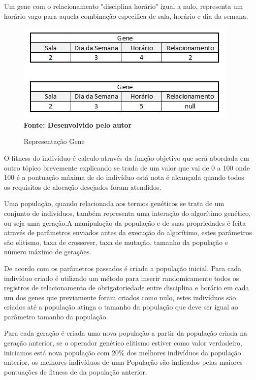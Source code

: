 Um gene com o relacionamento "disciplina horário" igual a nulo, representa um horário vago para aquela combinação especifica de sala, horário e dia da semana.\par

\begin{figure}[!htb]
\caption[Representação Gene]{Representação Gene}
\label{fig:figura5}
\centering
\includegraphics[scale=0.7]{imagens/representacaoGene.png}
\\ \textbf{\footnotesize Fonte: Desenvolvido pelo autor}
\end{figure}

O fitness do indivíduo é calculo através da função objetivo que será abordada em outro tópico brevemente explicando se trada de um valor que vai de 0 a 100 onde 100 é a pontuação máxima de do indivíduo está nota é alcançada quando todos os requisitos de alocação desejados foram atendidos.


Uma população, quando relacionada aos termos genéticos se trata de um conjunto de indivíduos, também representa uma interação do algorítimo genético, ou seja uma geração.A manipulação da população e de suas propriedades é feita através de parâmetros enviados antes da execução do algorítimo, estes parâmetros são elitismo, taxa de crossover, taxa de mutação, tamanho da população e número máximo de gerações.

De acordo com os parâmetros passados é criada a população inicial. Para cada indivíduo criado é utilizado um método para inserir randomicamente todos os registros de relacionamento de obrigatoriedade entre disciplina e horário em cada um dos genes que previamente foram criados como nulo, estes indivíduos são criados até a população atinga o tamanho da população que deve ser igual ao parâmetro tamanho da população.\par

Para cada geração é criada uma nova população a partir da população criada na geração anterior, se o operador genético elitismo estiver como valor verdadeiro, iniciamos está nova população com 20\% dos melhores indivíduos da população anterior, os melhores indivíduos de uma População são indicados pelas maiores pontuações de fitness de da população anterior.\par

